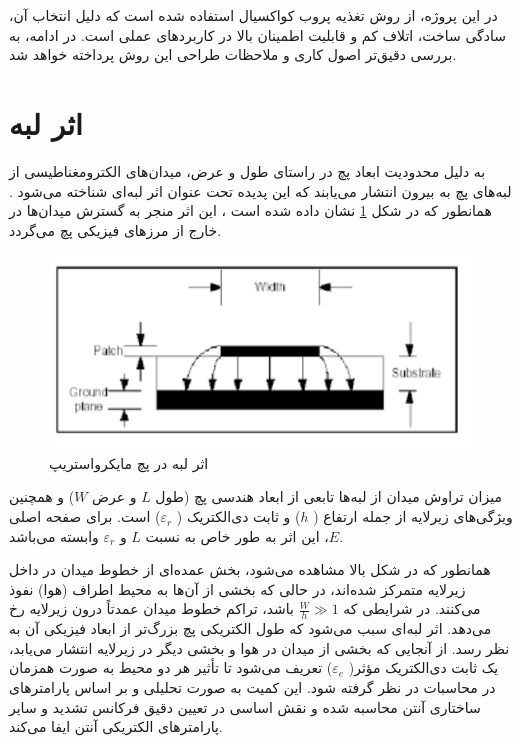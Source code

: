 در این پروژه، از روش تغذیه پروب کواکسیال استفاده شده است که دلیل انتخاب آن، سادگی ساخت، اتلاف کم و قابلیت اطمینان بالا در کاربردهای عملی است. در ادامه، به بررسی دقیق‌تر اصول کاری و ملاحظات طراحی این روش پرداخته خواهد شد.


\section{اثر لبه}

به دلیل محدودیت ابعاد پچ در راستای طول و عرض، میدان‌های الکترومغناطیسی از لبه‌های پچ به بیرون انتشار می‌یابند که این پدیده تحت عنوان اثر لبه‌ای
شناخته می‌شود
\cite{chahar}.
همانطور که در شکل 
\ref{fig8}
نشان داده شده است
\cite{do}،
این اثر منجر به گسترش میدان‌ها در خارج از مرزهای فیزیکی پچ می‌گردد.

\begin{figure}
	\centering
	\includegraphics[scale=0.3]{Images/fig8.png}
	\caption{اثر لبه در پچ مایکرواستریپ}
	\label{fig8}
\end{figure}

میزان تراوش میدان از لبه‌ها تابعی از ابعاد هندسی پچ (طول
$L$
 و عرض
$W$)
 و همچنین ویژگی‌های زیرلایه از جمله ارتفاع (
$h$)
 و ثابت دی‌الکتریک (
 $\varepsilon_r$)
 است. برای صفحه اصلی
 $E$،
  این اثر به طور خاص به نسبت
$L$
  و
$\varepsilon_r$
 وابسته می‌باشد.


همانطور که در شکل بالا مشاهده می‌شود، بخش عمده‌ای از خطوط میدان در داخل زیرلایه متمرکز شده‌اند، در حالی که بخشی از آن‌ها به محیط اطراف (هوا) نفوذ می‌کنند. در شرایطی که
$ \frac{W}{h} \gg 1$
 باشد، تراکم خطوط میدان عمدتاً درون زیرلایه رخ می‌دهد. اثر لبه‌ای سبب می‌شود که طول الکتریکی پچ بزرگ‌تر از ابعاد فیزیکی آن به نظر رسد. از آنجایی که بخشی از میدان در هوا و بخشی دیگر در زیرلایه انتشار می‌یابد، یک ثابت دی‌الکتریک مؤثر(
$\varepsilon_{e}$)
 تعریف می‌شود تا تأثیر هر دو محیط به صورت همزمان در محاسبات در نظر گرفته شود. این کمیت به صورت تحلیلی و بر اساس پارامترهای ساختاری آنتن محاسبه شده و نقش اساسی در تعیین دقیق فرکانس تشدید و سایر پارامترهای الکتریکی آنتن ایفا می‌کند.


